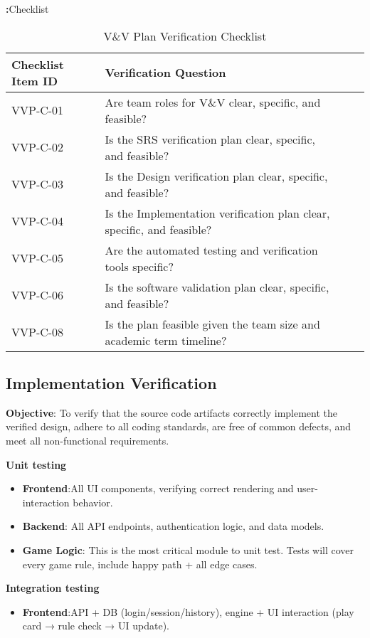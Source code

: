 \documentclass[12pt, titlepage]{article}
\begin{document}
\noindent \textbf:{Checklist}
\begin{table}[H]
\centering
\caption{V\&V Plan Verification Checklist}
\label{tab:vvp-checklist}
\begin{tabular}{|l|p{}|l|l|}
\hline
\textbf{Checklist Item ID} & \textbf{Verification Question} \\ \hline
VVP-C-01 & Are team roles for V\&V clear, specific, and feasible? \\ \hline
VVP-C-02 & Is the SRS verification plan clear, specific, and feasible? \\ \hline
VVP-C-03 & Is the Design verification plan clear, specific, and feasible? \\ \hline
VVP-C-04 & Is the Implementation verification plan clear, specific, and feasible? \\ \hline
VVP-C-05 & Are the automated testing and verification tools specific?  \\ \hline
VVP-C-06 & Is the software validation plan clear, specific, and feasible?  \\ \hline
VVP-C-08 & Is the plan feasible given the team size and academic term timeline?  \\ \hline
\end{tabular}
\end{table}

\subsection{Implementation Verification}

\noindent \textbf{Objective}: To verify that the source code artifacts correctly implement the verified design, adhere to all coding standards, are free of common defects, and meet all non-functional requirements.

\noindent \textbf{Unit testing}
\begin{itemize}
	\item \textbf{Frontend}:All UI components, verifying correct rendering and user-interaction behavior.
	\item \textbf{Backend}: All API endpoints, authentication logic, and data models.
	\item \textbf{Game Logic}: This is the most critical module to unit test. Tests will cover every game rule, include happy path + all edge cases.

\end{itemize}
\noindent \textbf{Integration testing}
\begin{itemize}
	\item \textbf{Frontend}:API + DB (login/session/history), engine + UI interaction (play card → rule check → UI update).
\end{itemize}
\end{document}
